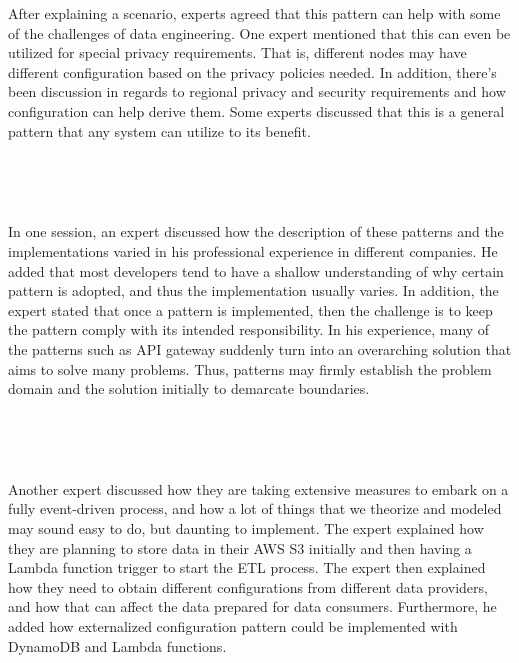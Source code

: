 \documentclass{bmcart}
\begin{document}
After explaining a scenario, experts agreed that this pattern can help with some of the challenges of data engineering. One expert mentioned that this can even be utilized for special privacy requirements. That is, different nodes may have different configuration based on the privacy policies needed. In addition, there's been discussion in regards to regional privacy and security requirements and how configuration can help derive them. Some experts discussed that this is a general pattern that any system can utilize to its benefit. 

\,

\setlength{\fboxsep}{0.7em}
\noindent{}

\,

In one session, an expert discussed how the description of these patterns and the implementations varied in his professional experience in different companies. He added that most developers tend to have a shallow understanding of why certain pattern is adopted, and thus the implementation usually varies. In addition, the expert stated that once a pattern is implemented, then the challenge is to keep the pattern comply with its intended responsibility. In his experience, many of the patterns such as API gateway suddenly turn into an overarching solution that aims to solve many problems. Thus, patterns may firmly establish the problem domain and the solution initially to demarcate boundaries.

\,

\setlength{\fboxsep}{0.7em}
\noindent{}

\,

Another expert discussed how they are taking extensive measures to embark on a fully event-driven process, and how a lot of things that we theorize and modeled may sound easy to do, but daunting to implement. The expert explained how they are planning to store data in their AWS S3 initially and then having a Lambda function trigger to start the ETL process. The expert then explained how they need to obtain different configurations from different data providers, and how that can affect the data prepared for data consumers. Furthermore, he added how externalized configuration pattern could be implemented with DynamoDB and Lambda functions.
\end{document}
